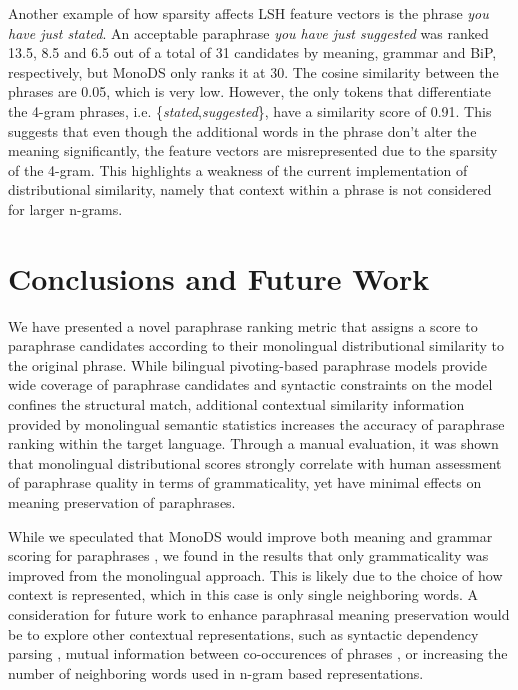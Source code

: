 \documentclass[11pt]{article}
\newcommand{\mnote}[1]{\marginpar{\raggedleft\footnotesize\itshape#1}}
\begin{document}
{{%
Another example of how sparsity affects LSH feature vectors is the phrase \emph{you have just stated}. An acceptable paraphrase \emph{you have just suggested} was ranked 13.5, 8.5 and 6.5 out of a total of 31 candidates by meaning, grammar and BiP, respectively, but MonoDS only ranks it at 30. The cosine similarity between the phrases are 0.05, which is very low. However, the only tokens that differentiate the 4-gram phrases, i.e. \{\emph{stated},\emph{suggested}\}, have a similarity score of 0.91. This suggests that even though the additional words in the phrase don't alter the meaning significantly, the feature vectors are misrepresented due to the sparsity of the 4-gram. This highlights a weakness of the current implementation of distributional similarity, namely that context within a phrase is not considered for larger n-grams.

\section{Conclusions and Future Work}
We have presented a novel paraphrase ranking metric that assigns a score to paraphrase candidates according to their monolingual distributional similarity to the original phrase. While bilingual pivoting-based paraphrase models provide wide coverage of paraphrase candidates and syntactic constraints on the model confines the structural match, additional contextual similarity information provided by monolingual semantic statistics increases the accuracy of paraphrase ranking within the target language. %
Through a manual evaluation, it was shown that monolingual distributional scores strongly correlate with human assessment of paraphrase quality in terms of grammaticality, yet have minimal effects on meaning preservation of paraphrases.

While we speculated that MonoDS would improve both meaning and grammar scoring
for paraphrases%
, we found in the results that only grammaticality was
improved from the monolingual approach. This is likely due to the choice of how
context is represented, which in this case is only single neighboring words. A
consideration for future work to enhance paraphrasal meaning preservation would
be to explore other contextual representations, such as syntactic dependency
parsing \cite{LinACL97}, mutual information between co-occurences of phrases
, or increasing the number of neighboring words used in
n-gram based representations.

}}
\end{document}
